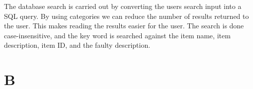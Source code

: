 \documentclass[12pt]{report}
\begin{document}

The database search is carried out by converting the users search input
into a SQL query.  By using categories we can reduce the number of results
returned to the user.  This makes reading the results easier for the user.
The search is done case-insensitive, and the key word is searched against
the item name, item description, item ID, and the faulty description.

\chapter*{B}
\end{document}
